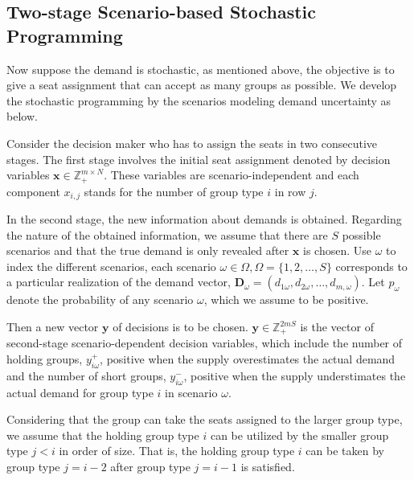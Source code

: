 
\subsection{Two-stage Scenario-based Stochastic Programming}
Now suppose the demand is stochastic, as mentioned above, the objective is to give a seat assignment that can accept as many groups as possible. We develop the stochastic programming by the scenarios modeling demand uncertainty as below.

Consider the decision maker who has to assign the seats in two consecutive stages. The first stage involves the initial seat assignment denoted by decision variables $\mathbf{x}\in \mathbb{Z}_{+}^{m \times N}$. These variables are scenario-independent and each component $x_{i,j}$ stands for the number of group type $i$ in row $j$.

In the second stage, the new information about demands is obtained. Regarding the nature of the obtained information, we assume that there are $S$ possible scenarios and that the true demand is only revealed after $\mathbf{x}$ is chosen. Use $\omega$ to index the different scenarios, each scenario $\omega \in \Omega, \Omega=\{1,2,\ldots,S\}$ corresponds to a particular realization of the demand vector, $\mathbf{D}_\omega = (d_{1\omega},d_{2\omega},\ldots,d_{m,\omega})$. Let $p_{\omega}$ denote the probability of any scenario $\omega$, which we assume to be positive.

Then a new vector $\mathbf{y}$ of decisions is to be chosen. $\mathbf{y} \in \mathbb{Z}_{+}^{2mS}$ is the vector of second-stage scenario-dependent decision variables, which include the number of holding groups, $y_{i \omega}^{+}$, positive when the supply overestimates the actual demand and the number of short groups, $y_{i \omega}^{-}$, positive when the supply understimates the actual demand for group type $i$ in scenario $\omega$.



Considering that the group can take the seats assigned to the larger group type, we assume that the holding group type $i$ can be utilized by the smaller group type $j < i$ in order of size. That is,
the holding group type $i$ can be taken by group type $j = i-2$ after group type $j = i-1$ is satisfied.

